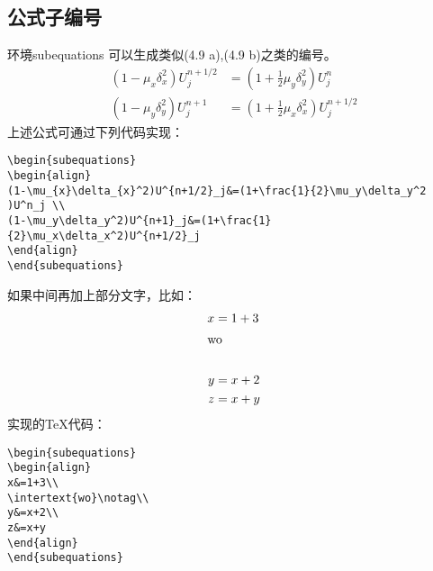 \subsection{公式子编号}
环境subequations 可以生成类似(4.9 a),(4.9 b)之类的编号。
\begin{subequations}
	\begin{align}
	(1-\mu_{x}\delta_{x}^2)U^{n+1/2}_j&=(1+\frac{1}{2}\mu_y\delta_y^2 )U^n_j \\
	(1-\mu_y\delta_y^2)U^{n+1}_j&=(1+\frac{1}{2}\mu_x\delta_x^2)U^{n+1/2}_j
	\end{align}
\end{subequations}
上述公式可通过下列代码实现：
\begin{lstlisting}
\begin{subequations}
\begin{align}
(1-\mu_{x}\delta_{x}^2)U^{n+1/2}_j&=(1+\frac{1}{2}\mu_y\delta_y^2 )U^n_j \\
(1-\mu_y\delta_y^2)U^{n+1}_j&=(1+\frac{1}{2}\mu_x\delta_x^2)U^{n+1/2}_j
\end{align}
\end{subequations}
\end{lstlisting}
如果中间再加上部分文字，比如：
\begin{subequations}
	\begin{align}
	x&=1+3\\
	\intertext{wo}\notag\\
	y&=x+2\\
	z&=x+y
	\end{align}
\end{subequations}
实现的\TeX{}代码：
\begin{lstlisting}
\begin{subequations}
\begin{align}
x&=1+3\\
\intertext{wo}\notag\\
y&=x+2\\
z&=x+y
\end{align}
\end{subequations}
\end{lstlisting}








